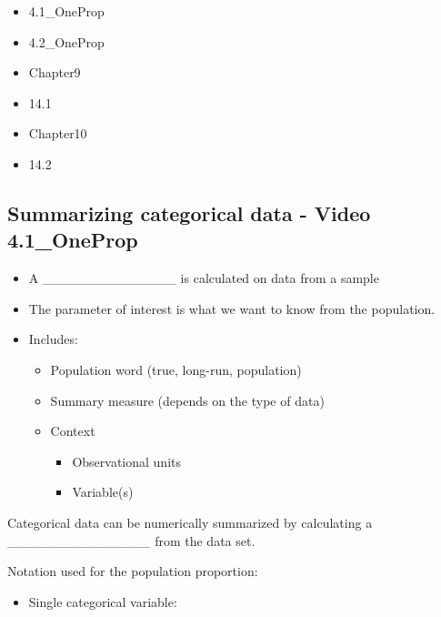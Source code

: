 \documentclass[
]{report}
\providecommand{\tightlist}{%
  \setlength{\itemsep}{0pt}\setlength{\parskip}{0pt}}
\begin{document}
\begin{itemize}
\item
  4.1\_OneProp
\item
  4.2\_OneProp
\item
  Chapter9
\item
  14.1
\item
  Chapter10
\item
  14.2
\end{itemize}


\subsection*{Summarizing categorical data - Video 4.1\_OneProp}\label{summarizing-categorical-data---video-4.1_oneprop}

\begin{itemize}
\item
  A \_\_\_\_\_\_\_\_\_\_\_\_\_\_ is calculated on data from a sample
\item
  The parameter of interest is what we want to know from the population.
\item
  Includes:

  \begin{itemize}
  \item
    Population word (true, long-run, population)
  \item
    Summary measure (depends on the type of data)
  \item
    Context

    \begin{itemize}
    \item
      Observational units
    \item
      Variable(s)
    \end{itemize}
  \end{itemize}
\end{itemize}

Categorical data can be numerically summarized by calculating a \_\_\_\_\_\_\_\_\_\_\_\_\_\_\_ from the data set.

Notation used for the population proportion:

\begin{itemize}
\tightlist
\item
  Single categorical variable:
\end{itemize}

\vspace{0.2in}
\end{document}
